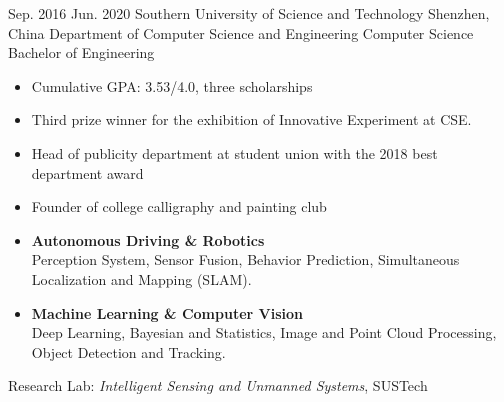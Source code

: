 \documentclass{resume}
\begin{document}
\makeheader

\begin{educations}
  \education%
    {Sep. 2016}%
    {Jun. 2020}%
    {Southern University of Science and Technology}%
    {Shenzhen, China}%
    {Department of Computer Science and Engineering}%
    {Computer Science}%
    {Bachelor of Engineering}%
	{\begin{itemize}%
		\item Cumulative GPA: 3.53/4.0, three scholarships
		\item Third prize winner for the exhibition of Innovative Experiment at CSE.
		\item Head of publicity department at student union with the 2018 best department award
		\item Founder of college calligraphy and painting club
	\end{itemize}}%
\end{educations}
	
\begin{itemize}
  \item \textbf{Autonomous Driving \& Robotics}\\
  	Perception System, Sensor Fusion, Behavior Prediction, Simultaneous Localization and Mapping (SLAM).
  \item \textbf{Machine Learning \& Computer Vision}\\
  	Deep Learning, Bayesian and Statistics, Image and Point Cloud Processing, Object Detection and Tracking.
\end{itemize}


Research Lab: \textit{Intelligent Sensing and Unmanned Systems}, SUSTech
\end{document}
